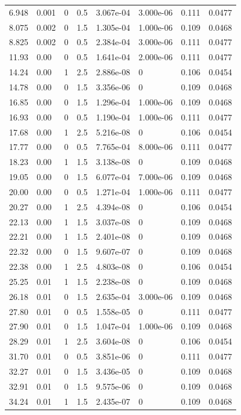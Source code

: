 \documentclass[preview]{standalone}
\begin{document}
{{\begin{tabular}{L{1.2cm}C{1.2cm} C{0.3cm}C{0.5cm} C{1.4cm}C{1.4cm} C{1.4cm}C{1.4cm}}
  6.948  &  0.001  & 0     & 0.5 &  3.067e-04  & 3.000e-06  & 0.111 &  0.0477   \\ 
  8.075  &  0.002  & 0     & 1.5 &  1.305e-04  & 1.000e-06  & 0.109 &  0.0468   \\ 
  8.825  &  0.002  & 0     & 0.5 &  2.384e-04  & 3.000e-06  & 0.111 &  0.0477   \\ 
  11.93  &  0.00  & 0     & 0.5 &  1.641e-04  & 2.000e-06  & 0.111 &  0.0477   \\ 
  14.24  &  0.00  & 1     & 2.5 &  2.886e-08  & 0  & 0.106 &  0.0454   \\ 
  14.78  &  0.00  & 0     & 1.5 &  3.356e-06  & 0  & 0.109 &  0.0468   \\ 
  16.85  &  0.00  & 0     & 1.5 &  1.296e-04  & 1.000e-06  & 0.109 &  0.0468   \\ 
  16.93  &  0.00  & 0     & 0.5 &  1.190e-04  & 1.000e-06  & 0.111 &  0.0477   \\ 
  17.68  &  0.00  & 1     & 2.5 &  5.216e-08  & 0  & 0.106 &  0.0454   \\ 
  17.77  &  0.00  & 0     & 0.5 &  7.765e-04  & 8.000e-06  & 0.111 &  0.0477   \\ 
  18.23  &  0.00  & 1     & 1.5 &  3.138e-08  & 0  & 0.109 &  0.0468   \\ 
  19.05  &  0.00  & 0     & 1.5 &  6.077e-04  & 7.000e-06  & 0.109 &  0.0468   \\ 
  20.00  &  0.00  & 0     & 0.5 &  1.271e-04  & 1.000e-06  & 0.111 &  0.0477   \\ 
  20.27  &  0.00  & 1     & 2.5 &  4.394e-08  & 0  & 0.106 &  0.0454   \\ 
  22.13  &  0.00  & 1     & 1.5 &  3.037e-08  & 0  & 0.109 &  0.0468   \\ 
  22.21  &  0.00  & 1     & 1.5 &  2.401e-08  & 0  & 0.109 &  0.0468   \\ 
  22.32  &  0.00  & 0     & 1.5 &  9.607e-07  & 0  & 0.109 &  0.0468   \\ 
  22.38  &  0.00  & 1     & 2.5 &  4.803e-08  & 0  & 0.106 &  0.0454   \\ 
  25.25  &  0.01  & 1     & 1.5 &  2.238e-08  & 0  & 0.109 &  0.0468   \\ 
  26.18  &  0.01  & 0     & 1.5 &  2.635e-04  & 3.000e-06  & 0.109 &  0.0468   \\ 
  27.80  &  0.01  & 0     & 0.5 &  1.558e-05  & 0  & 0.111 &  0.0477   \\ 
  27.90  &  0.01  & 0     & 1.5 &  1.047e-04  & 1.000e-06  & 0.109 &  0.0468   \\ 
  28.29  &  0.01  & 1     & 2.5 &  3.604e-08  & 0  & 0.106 &  0.0454   \\ 
  31.70  &  0.01  & 0     & 0.5 &  3.851e-06  & 0  & 0.111 &  0.0477   \\ 
  32.27  &  0.01  & 0     & 1.5 &  3.436e-05  & 0  & 0.109 &  0.0468   \\ 
  32.91  &  0.01  & 0     & 1.5 &  9.575e-06  & 0  & 0.109 &  0.0468   \\ 
  34.24  &  0.01  & 1     & 1.5 &  2.435e-07  & 0  & 0.109 &  0.0468   \\ 
\hline 
\end{tabular} 

}}
\end{document}
